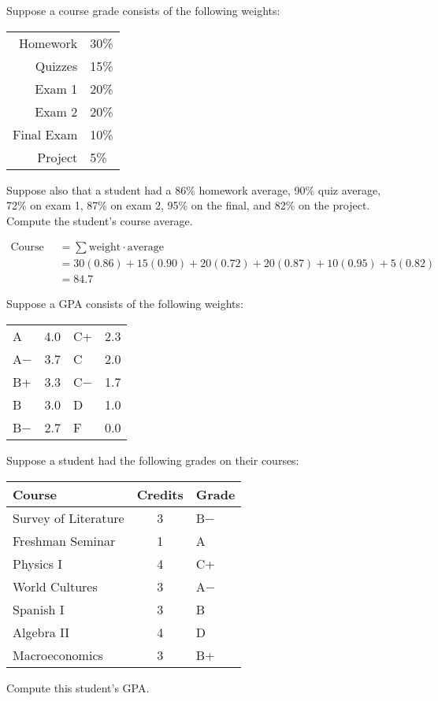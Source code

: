 \documentclass[11pt,letterpaper]{article}
\begin{document}

 Suppose a course grade consists of the following weights:
	\begin{table}[!ht]
	\centering
	\begin{tabular}{rl}
	Homework & 30\% \\
	Quizzes & 15\% \\
	Exam 1 & 20\% \\
	Exam 2 & 20\% \\
	Final Exam & 10\% \\
	Project & 5\%
	\end{tabular}
	\end{table} \par
Suppose also that a student had a 86\% homework average, 90\% quiz average, 72\% on exam 1, 87\% on exam 2, 95\% on the final, and 82\% on the project. Compute the student's course average. \pspace

\sol 
	\[
	\begin{aligned}
	\text{Course Average}&= \sum \text{weight} \cdot \text{average} \\[0.3cm]
	&= 30(0.86) + 15(0.90) + 20(0.72) + 20(0.87) + 10(0.95) + 5(0.82) \\[0.3cm]
	&= 84.7
	\end{aligned}
	\]
	


\newpage



 Suppose a GPA consists of the following weights:
	\begin{table}[!ht]
	\centering
	\begin{tabular}{lr|lr}
	A & 4.0 & C+ & 2.3 \\
	A$-$ & 3.7 & C & 2.0 \\
	B+ & 3.3 & C$-$ & 1.7 \\
	B & 3.0 & D & 1.0 \\
	B$-$ & 2.7 & F & 0.0
	\end{tabular}
	\end{table} \par
Suppose a student had the following grades on their courses:
	\begin{table}[!ht]
	\centering
	\begin{tabular}{lcl}
	Course & Credits & Grade \\ \hline
	Survey of Literature & 3 & B$-$ \\
	Freshman Seminar & 1 & A \\
	Physics I & 4 & C+ \\
	World Cultures & 3 & A$-$ \\
	Spanish I & 3 & B \\
	Algebra II & 4 & D \\
	Macroeconomics & 3 & B+
	\end{tabular}
	\end{table}
Compute this student's GPA. \pspace
\end{document}
